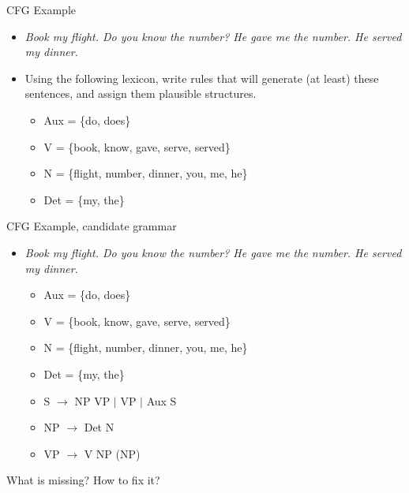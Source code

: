 \documentclass{beamer}
\begin{document}
\begin{frame}{CFG Example}
  \begin{itemize}
  \item {\it Book my flight. Do you know the number? He gave me the
      number. He served my dinner.}
  \item Using the following lexicon, write rules that will generate
    (at least) these sentences, and assign them plausible structures.
    \begin{itemize}
    \item Aux = \{do, does\}
    \item V = \{book, know, gave, serve, served\}
    \item N = \{flight, number, dinner, you, me, he\} 
    \item Det = \{my, the\}
    \end{itemize}
\end{itemize}
\end{frame}

\begin{frame}{CFG Example, candidate grammar}
  \begin{itemize}
  \item {\it Book my flight. Do you know the number? He gave me the number. He served my dinner.}
    \begin{itemize}
    \item Aux = \{do, does\}
    \item V = \{book, know, gave, serve, served\}
    \item N = \{flight, number, dinner, you, me, he\} 
    \item Det = \{my, the\}
    \item S $\rightarrow$ NP VP $\vert$ VP $\vert$ Aux S
    \item NP $\rightarrow$ Det N
    \item VP $\rightarrow$ V NP (NP)
    \end{itemize}
  \end{itemize}
  What is missing? How to fix it?
\end{frame}
\end{document}
